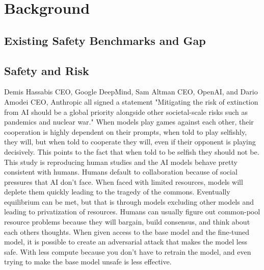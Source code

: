 \section{Background}

\subsection{Existing Safety Benchmarks and Gap}


\subsection{Safety and Risk}
\citep{noauthor_statement_nodate}
Demis Hassabis CEO, Google DeepMind, Sam Altman CEO, OpenAI, and Dario Amodei CEO, Anthropic all signed a statement "Mitigating the risk of extinction from AI should be a global priority alongside other societal-scale risks such as pandemics and nuclear war."
\citep{phelps_machine_2024}
When models play games against each other, their cooperation is highly dependent on their prompts, when told to play selfishly, they will, but when told to cooperate they will, even if their opponent is playing decisively. This points to the fact that when told to be selfish they should not be. This study is reproducing human studies and the AI models behave pretty consistent with humans. Humans default to collaboration because of social pressures that AI don't face.
\citep{perolat_multi_agent_2017}
When faced with limited resources, models will deplete them quickly leading to the tragedy of the commons. Eventually equilibrium can be met, but that is through models excluding other models and leading to privatization of resources. Humans can usually figure out common-pool resource problems because they will bargain, build consensus, and think about each others thoughts.
\citep{zhou_emulated_2024}
When given access to the base model and the fine-tuned model, it is possible to create an adversarial attack that makes the model less safe. With less compute because you don't have to retrain the model, and even trying to make the base model unsafe is less effective.
